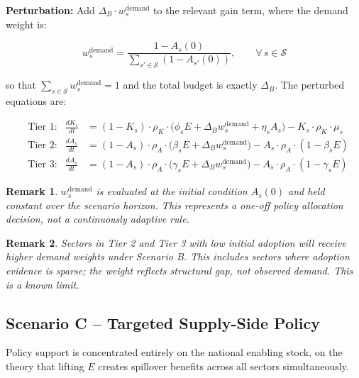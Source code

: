 \documentclass[11pt,a4paper]{article}
\newtheorem{remark}{Remark}
\begin{document}
\textbf{Perturbation:} Add $\Delta_B \cdot w_s^{\text{demand}}$ to the relevant gain term, where the demand weight is:

\begin{equation}
w_s^{\text{demand}} = \frac{1 - A_s(0)}{\displaystyle\sum_{s' \in \mathcal{S}}(1 - A_{s'}(0))}, \qquad \forall\, s \in \mathcal{S}
\label{eq:demandweight}
\end{equation}

so that $\sum_{s \in \mathcal{S}} w_s^{\text{demand}} = 1$ and the total budget is exactly $\Delta_B$. The perturbed equations are:

\begin{equation}
\begin{aligned}
&\text{Tier 1:} &\frac{dK_s}{dt} &= (1 - K_s)\cdot\rho_K\cdot\bigl(\phi_s E + \Delta_B w_s^{\text{demand}} + \eta_s A_s\bigr) - K_s\cdot\rho_K\cdot\mu_s \\[6pt]
&\text{Tier 2:} &\frac{dA_s}{dt} &= (1 - A_s)\cdot\rho_A\cdot\bigl(\beta_s E + \Delta_B w_s^{\text{demand}}\bigr) - A_s\cdot\rho_A\cdot(1 - \beta_s E) \\[6pt]
&\text{Tier 3:} &\frac{dA_s}{dt} &= (1 - A_s)\cdot\rho_A\cdot\bigl(\gamma_s E + \Delta_B w_s^{\text{demand}}\bigr) - A_s\cdot\rho_A\cdot(1 - \gamma_s E)
\end{aligned}
\label{eq:scenB}
\end{equation}

\begin{remark}
$w_s^{\text{demand}}$ is evaluated at the initial condition $A_s(0)$ and held constant over the scenario horizon. This represents a one-off policy allocation decision, not a continuously adaptive rule.
\end{remark}

\begin{remark}
Sectors in Tier 2 and Tier 3 with low initial adoption will receive higher demand weights under Scenario B. This includes sectors where adoption evidence is sparse; the weight reflects structural gap, not observed demand. This is a known limit.
\end{remark}

\subsection{Scenario C -- Targeted Supply-Side Policy}

Policy support is concentrated entirely on the national enabling stock, on the theory that lifting $E$ creates spillover benefits across all sectors simultaneously.
\end{document}
